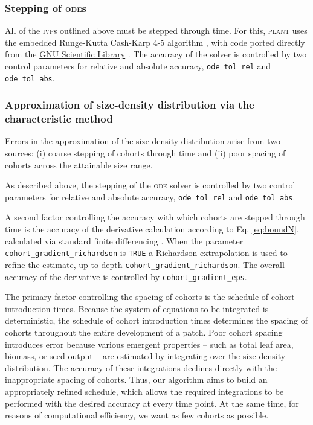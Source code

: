 \documentclass[10pt,twoside]{article}
\newcommand{\plant}{\textsc{plant}}
\begin{document}
\subsubsection{Stepping of \textsc{ode}s}

All of the \textsc{ivp}s outlined above must be stepped through time.
For this, {\plant} uses
the embedded Runge-Kutta Cash-Karp 4-5 algorithm \citep{Cash-1990}, with
code ported directly from the
\href{http://www.gnu.org/software/gsl/}{GNU Scientific Library}
\citep{Galassi-2009}. The accuracy of the solver is controlled by two
control parameters for relative and absolute accuracy,
\texttt{ode\_tol\_rel} and \texttt{ode\_tol\_abs}.

\subsubsection{Approximation of size-density distribution via the characteristic method}
\label{approximation-of-size-density-distribution-via-the-ebt}

Errors in the approximation of the size-density distribution arise from two sources:
(i) coarse stepping of cohorts through time and
(ii) poor spacing of cohorts across the attainable size range.

As described above, the stepping of the \textsc{ode} solver is controlled by two
control parameters for relative and absolute accuracy,
\texttt{ode\_tol\_rel} and \texttt{ode\_tol\_abs}.

A second factor controlling the accuracy with which cohorts are stepped
through time is the accuracy of the derivative calculation according to Eq.
\ref{eq:boundN}, calculated via standard finite differencing
\citep{Abramowitz-2012}. When the parameter
\texttt{cohort\_gradient\_richardson} is \texttt{TRUE} a Richardson extrapolation
\citep{Stoer-2002} is used to refine the estimate, up to depth
\texttt{cohort\_gradient\_richardson}. The overall accuracy of the
derivative is controlled by \texttt{cohort\_gradient\_eps}.

The primary factor controlling the spacing of cohorts is the schedule of
cohort introduction times. Because the system of equations to be integrated is deterministic, the
schedule of cohort introduction times determines the spacing of cohorts
throughout the entire development of a patch. Poor cohort spacing
introduces error because various emergent properties -- such as total
leaf area, biomass, or seed output -- are estimated by integrating over
the size-density distribution. The accuracy of these integrations declines
directly with the inappropriate spacing of cohorts. Thus, our algorithm aims to build an
appropriately refined schedule, which allows the required integrations to be
performed with the desired accuracy at every time point. At the same
time, for reasons of computational efficiency, we want as few cohorts as possible.
\end{document}
